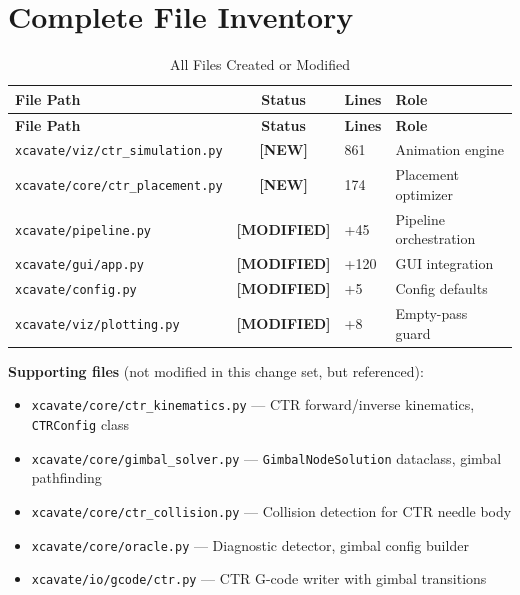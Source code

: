 \documentclass[11pt,a4paper]{article}
\newcommand{\filename}[1]{\texttt{\textcolor{accentblue}{#1}}}
\newcommand{\newlabel}{\textcolor{newfile}{\textbf{[NEW]}}}
\newcommand{\modlabel}{\textcolor{modifiedfile}{\textbf{[MODIFIED]}}}
\begin{document}
\section{Complete File Inventory}
\label{sec:inventory}

\begin{longtable}{p{7.5cm}clp{3.5cm}}
\caption{All Files Created or Modified} \\
\toprule
\textbf{File Path} & \textbf{Status} & \textbf{Lines} & \textbf{Role} \\
\midrule
\endfirsthead
\toprule
\textbf{File Path} & \textbf{Status} & \textbf{Lines} & \textbf{Role} \\
\midrule
\endhead
\filename{xcavate/viz/ctr\_simulation.py} & \newlabel & 861 & Animation engine \\
\filename{xcavate/core/ctr\_placement.py} & \newlabel & 174 & Placement optimizer \\
\filename{xcavate/pipeline.py} & \modlabel & +45 & Pipeline orchestration \\
\filename{xcavate/gui/app.py} & \modlabel & +120 & GUI integration \\
\filename{xcavate/config.py} & \modlabel & +5 & Config defaults \\
\filename{xcavate/viz/plotting.py} & \modlabel & +8 & Empty-pass guard \\
\bottomrule
\end{longtable}

\noindent \textbf{Supporting files} (not modified in this change set, but referenced):
\begin{itemize}[nosep]
    \item \filename{xcavate/core/ctr\_kinematics.py} --- CTR forward/inverse kinematics, \texttt{CTRConfig} class
    \item \filename{xcavate/core/gimbal\_solver.py} --- \texttt{GimbalNodeSolution} dataclass, gimbal pathfinding
    \item \filename{xcavate/core/ctr\_collision.py} --- Collision detection for CTR needle body
    \item \filename{xcavate/core/oracle.py} --- Diagnostic detector, gimbal config builder
    \item \filename{xcavate/io/gcode/ctr.py} --- CTR G-code writer with gimbal transitions
\end{itemize}
\end{document}
